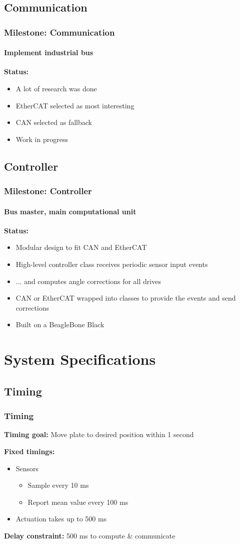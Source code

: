 \documentclass{beamer}
\begin{document}
\subsection{Communication}
\begin{frame}
  \frametitle{Milestone: Communication}
  \framesubtitle{Implement industrial bus}
  \textbf{Status:}
  \begin{itemize}
    \item A lot of research was done
    \item EtherCAT selected as most interesting
    \item CAN selected as fallback
    \item Work in progress
  \end{itemize}
\end{frame}

\subsection{Controller}
\begin{frame}
  \frametitle{Milestone: Controller}
  \framesubtitle{Bus master, main computational unit}
  \textbf{Status:}
  \begin{itemize}
    \item Modular design to fit CAN and EtherCAT
    \item High-level controller class receives periodic sensor input events
    \item ... and computes angle corrections for all drives
    \item CAN or EtherCAT wrapped into classes to provide the events and send corrections
    \item Built on a BeagleBone Black
  \end{itemize}
\end{frame}


\section{System Specifications}
\subsection{Timing}
\begin{frame}
  \frametitle{Timing}
  \textbf{Timing goal:} Move plate to desired position within 1 second

  \vfill

  \textbf{Fixed timings:}
  \begin{itemize}
    \item Sensors
      \begin{itemize}
        \item Sample every 10 ms
        \item Report mean value every 100 ms
      \end{itemize}
    \item Actuation takes up to 500 ms
  \end{itemize}

  \vfill

  \textbf{Delay constraint:} 500 ms to compute \& communicate
\end{frame}
\end{document}
